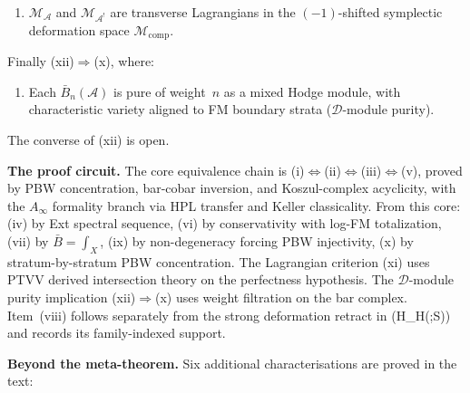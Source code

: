 \documentclass[11pt,reqno]{amsart}
\theoremstyle{definition}
\theoremstyle{remark}
\providecommand{\cA}{\mathcal{A}}
\providecommand{\barB}{\bar{B}}
\numberwithin{equation}{section}
\begin{document}
\begin{enumerate}[label=\textup{(\roman*)},nosep,start=11]
\item $\mathcal M_\cA$ and $\mathcal M_{\cA^!}$ are transverse Lagrangians in the $(-1)$-shifted symplectic deformation space $\mathcal M_{\mathrm{comp}}$.
\end{enumerate}

\noindent
Finally (xii)$\Rightarrow$(x), where:

\begin{enumerate}[label=\textup{(\roman*)},nosep,start=12]
\item Each $\barB_n(\cA)$ is pure of weight~$n$ as a mixed Hodge module, with characteristic variety aligned to FM boundary strata ($\mathcal D$-module purity).
\end{enumerate}

\noindent The converse of (xii) is open.

\medskip
\noindent\textbf{The proof circuit.}\enspace
The core equivalence chain is
(i)$\Leftrightarrow$(ii)$\Leftrightarrow$(iii)$\Leftrightarrow$(v),
proved by PBW concentration, bar-cobar inversion, and
Koszul-complex acyclicity, with the $A_\infty$
formality branch via HPL transfer and Keller classicality. From this
core: (iv) by Ext spectral sequence, (vi) by conservativity with
log-FM totalization, (vii) by $\barB=\int_X$, (ix) by non-degeneracy
forcing PBW injectivity, (x) by stratum-by-stratum PBW concentration.
The Lagrangian criterion (xi) uses PTVV derived intersection theory
on the perfectness hypothesis. The $\mathcal D$-module purity
implication (xii)$\Rightarrow$(x) uses weight filtration on the bar
complex.  Item~(viii) follows separately from the strong deformation
retract in (H_H(\cA;S)) and records its family-indexed support.

\medskip
\noindent\textbf{Beyond the meta-theorem.}\enspace
Six additional characterisations are proved in the text:
\end{document}
